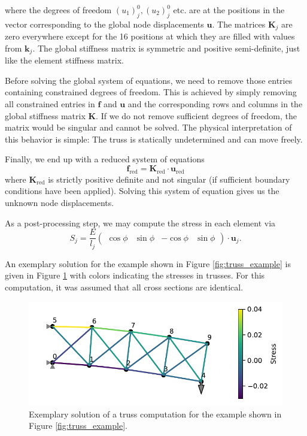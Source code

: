 where the degrees of freedom $(u_1)^0_j, (u_2)^0_j$ etc. are at the positions in the vector corresponding to the global node displacements $\mathbf{u}$. The matrices $\mathbf{K}_j$ are zero everywhere except for the 16 positions at which they are filled with values from $\mathbf{k}_j$.
The global stiffness matrix is symmetric and positive semi-definite, just like the element stiffness matrix.

Before solving the global system of equations, we need to remove those entries containing constrained degrees of freedom. This is achieved by simply removing all constrained entries in $\mathbf{f}$ and $\mathbf{u}$ and the corresponding rows and columns in the global stiffness matrix $\mathbf{K}$. If we do not remove sufficient degrees of freedom, the matrix would be singular and cannot be solved. The physical interpretation of this behavior is simple: The truss is statically undetermined and can move freely. 

Finally, we end up with a reduced system of equations 
\begin{equation}
     \mathbf{f}_\textrm{red} = \mathbf{K}_\textrm{red}  \cdot \mathbf{u}_\textrm{red} 
     \label{eq:reduced_system}
\end{equation}
where $\mathbf{K}_\textrm{red}$ is strictly positive definite and not singular (if sufficient boundary conditions have been applied). Solving this system of equation gives us the unknown node displacements. 

As a post-processing step, we may compute the stress in each element via
\begin{equation}
    S_j = \frac{E}{l_j} 
    \begin{pmatrix}
        \cos{\phi} & \sin{\phi} & -\cos{\phi} & \sin{\phi}
    \end{pmatrix}
    \cdot 
    \mathbf{u}_j.
\end{equation}

An exemplary solution for the example shown in Figure \ref{fig:truss_example} is given in Figure \ref{fig:truss_example_solved} with colors indicating the stresses in trusses. For this computation, it was assumed that all cross sections are identical.

\begin{figure}[!htpb]
    \centering
    \includegraphics[width=\textwidth]{figures/truss_sample_solved.pdf}
    \caption{Exemplary solution of a truss computation for the example shown in Figure \ref{fig:truss_example}.}
    \label{fig:truss_example_solved}
\end{figure}


